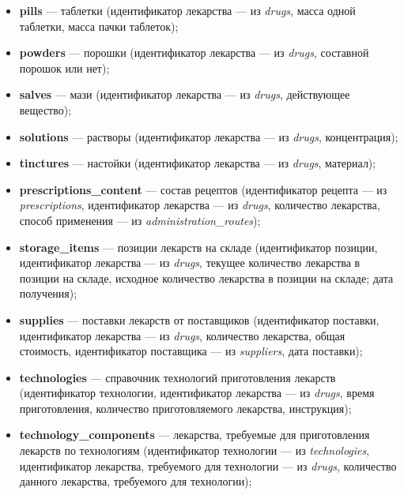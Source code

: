 \documentclass[a4paper]{article}
\newcommand{\dbtable}[1]{\textbf{#1}}
\newcommand{\dbtableref}[1]{\textit{#1}}
\begin{document}
\begin{itemize}
				\item \dbtable{pills} --- таблетки (идентификатор лекарства --- из \dbtableref{drugs}, масса одной таблетки, масса пачки таблеток);
					
				\item \dbtable{powders} --- порошки (идентификатор лекарства --- из \dbtableref{drugs}, составной порошок или нет);
					
				\item \dbtable{salves} --- мази (идентификатор лекарства --- из \dbtableref{drugs}, действующее вещество);
					
				\item \dbtable{solutions} --- растворы (идентификатор лекарства --- из \dbtableref{drugs}, концентрация);
					
				\item \dbtable{tinctures} --- настойки (идентификатор лекарства --- из \dbtableref{drugs}, материал);
					
				\item \dbtable{prescriptions\_content} --- состав рецептов (идентификатор рецепта --- из \dbtableref{prescriptions}, идентификатор лекарства --- из \dbtableref{drugs}, количество лекарства, способ применения --- из \dbtableref{administration\_routes});
					
				\item \dbtable{storage\_items} --- позиции лекарств на складе (идентификатор позиции, идентификатор лекарства --- из \dbtableref{drugs}, текущее количество лекарства в позиции на складе, исходное количество лекарства в позиции на складе; дата получения);
					
				\item \dbtable{supplies} --- поставки лекарств от поставщиков (идентификатор поставки, идентификатор лекарства --- из \dbtableref{drugs}, количество лекарства, общая стоимость, идентификатор поставщика --- из \dbtableref{suppliers}, дата поставки);
					
				\item \dbtable{technologies} --- справочник технологий приготовления лекарств (идентификатор технологии, идентификатор лекарства --- из \dbtableref{drugs}, время приготовления, количество приготовляемого лекарства, инструкция);
					
				\item \dbtable{technology\_components} --- лекарства, требуемые для приготовления лекарств по технологиям (идентификатор технологии --- из \dbtableref{technologies}, идентификатор лекарства, требуемого для технологии --- из \dbtableref{drugs}, количество данного лекарства, требуемого для технологии);
					

\end{itemize}
\end{document}
